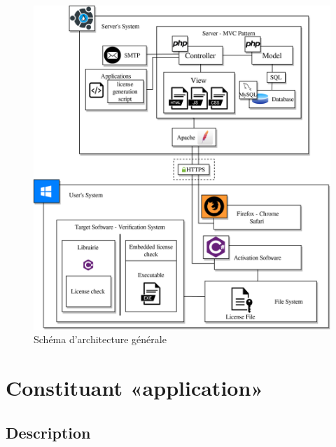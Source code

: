 \begin{figure}[h!]
	\centering
	\includegraphics{../png/DAT_general.png}
	\caption{Schéma d'architecture générale}
	\label{fig:fig1}
\end{figure}
\newpage

\section{Constituant «application»}

\subsection{Description}

